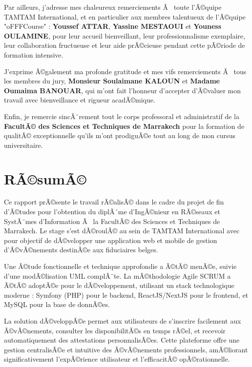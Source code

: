 \documentclass{rapportPFEHIND}
\begin{document}
Par ailleurs, j'adresse mes chaleureux remerciements Ã  toute l'Ã©quipe TAMTAM International, et en particulier aux membres talentueux de l'Ã©quipe "oFFFCourse" : \textbf{Youssef ATTAR}, \textbf{Yassine MESTAOUI} et \textbf{Youness OULAMINE}, pour leur accueil bienveillant, leur professionnalisme exemplaire, leur collaboration fructueuse et leur aide prÃ©cieuse pendant cette pÃ©riode de formation intensive.

J'exprime Ã©galement ma profonde gratitude et mes vifs remerciements Ã  tous les membres du jury, \textbf{Monsieur Soulaimane KALOUN} et \textbf{Madame Oumaima BANOUAR}, qui m'ont fait l'honneur d'accepter d'Ã©valuer mon travail avec bienveillance et rigueur acadÃ©mique.

Enfin, je remercie sincÃ¨rement tout le corps professoral et administratif de la \textbf{FacultÃ© des Sciences et Techniques de Marrakech} pour la formation de qualitÃ© exceptionnelle qu'ils m'ont prodiguÃ©e tout au long de mon cursus universitaire.

\newpage

\section*{RÃ©sumÃ©}

Ce rapport prÃ©sente le travail rÃ©alisÃ© dans le cadre du projet de fin d'Ã©tudes pour l'obtention du diplÃ´me d'IngÃ©nieur en RÃ©seaux et SystÃ¨mes d'Information Ã  la FacultÃ© des Sciences et Techniques de Marrakech. Le stage s'est dÃ©roulÃ© au sein de TAMTAM International avec pour objectif de dÃ©velopper une application web et mobile de gestion d'Ã©vÃ©nements destinÃ©e aux fiduciaires belges.

Une Ã©tude fonctionnelle et technique approfondie a Ã©tÃ© menÃ©e, suivie d'une modÃ©lisation UML complÃ¨te. La mÃ©thodologie Agile SCRUM a Ã©tÃ© adoptÃ©e pour le dÃ©veloppement, utilisant un stack technologique moderne : Symfony (PHP) pour le backend, ReactJS/NextJS pour le frontend, et MySQL pour la base de donnÃ©es.

La solution dÃ©veloppÃ©e permet aux utilisateurs de s'inscrire facilement aux Ã©vÃ©nements, consulter les disponibilitÃ©s en temps rÃ©el, et recevoir automatiquement des attestations personnalisÃ©es. Cette plateforme offre une gestion centralisÃ©e et intuitive des Ã©vÃ©nements professionnels, amÃ©liorant significativement l'expÃ©rience utilisateur et l'efficacitÃ© opÃ©rationnelle.
\end{document}

